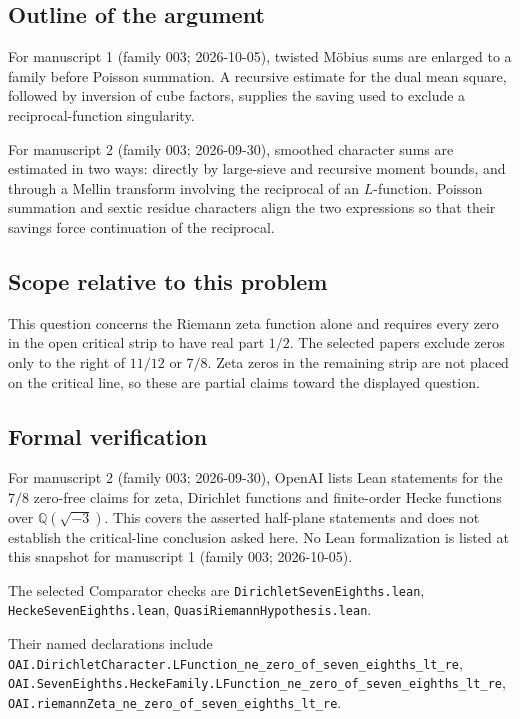 \documentclass[11pt]{article}
\begin{document}
\subsection{Outline of the argument}
For manuscript 1 (family 003; 2026-10-05), twisted M\"obius sums are enlarged to a family before Poisson summation. A recursive estimate for the dual mean square, followed by inversion of cube factors, supplies the saving used to exclude a reciprocal-function singularity.

For manuscript 2 (family 003; 2026-09-30), smoothed character sums are estimated in two ways: directly by large-sieve and recursive moment bounds, and through a Mellin transform involving the reciprocal of an $L$-function. Poisson summation and sextic residue characters align the two expressions so that their savings force continuation of the reciprocal.

\subsection{Scope relative to this problem}
This question concerns the Riemann zeta function alone and requires every zero in the open critical strip to have real part $1/2$. The selected papers exclude zeros only to the right of $11/12$ or $7/8$. Zeta zeros in the remaining strip are not placed on the critical line, so these are partial claims toward the displayed question.

\subsection{Formal verification}
For manuscript 2 (family 003; 2026-09-30), OpenAI lists Lean statements for the $7/8$ zero-free claims for zeta, Dirichlet functions and finite-order Hecke functions over $\mathbb Q(\sqrt{-3})$. This covers the asserted half-plane statements and does not establish the critical-line conclusion asked here. No Lean formalization is listed at this snapshot for manuscript 1 (family 003; 2026-10-05).

The selected Comparator checks are \texttt{DirichletSevenEighths.lean}, \texttt{HeckeSevenEighths.lean}, \texttt{QuasiRiemannHypothesis.lean}.

Their named declarations include \texttt{OAI.DirichletCharacter.LFunction\_ne\_zero\_of\_seven\_eighths\_lt\_re}, \texttt{OAI.SevenEighths.HeckeFamily.LFunction\_ne\_zero\_of\_seven\_eighths\_lt\_re}, \texttt{OAI.riemannZeta\_ne\_zero\_of\_seven\_eighths\_lt\_re}.
\end{document}
